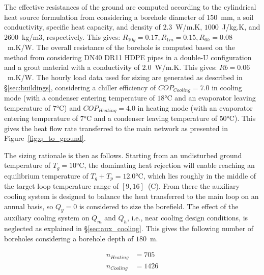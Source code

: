 The effective resistances of the ground are computed according to the cylindrical heat source formulation from \cite{Carslaw1947} considering a borehole diameter of $150$~mm, a soil conductivity, specific heat capacity, and density of $2.3$~W/m.K, $1000$~J/kg.K, and $2600$~kg/m3, respectively.
This gives: $R_{10y} = 0.17, R_{1m} = 0.15, R_{6h} = 0.08$~m.K/W.
The overall resistance of the borehole is computed based on the method from \cite{Kavanaugh2014} considering DN40 DR11 HDPE pipes in a double-U configuration and a grout material with a conductivity of $2.0$~W/m.K. This gives: $Rb = 0.06$~m.K/W.
The hourly load data used for sizing are generated as described in §\ref{sec:buildings}, considering a chiller efficiency of $COP_{Cooling} = 7.0$ in cooling mode (with a condenser entering temperature of $18$°C and an evaporator leaving temperature of $7$°C) and $COP_{Heating} = 4.0$ in heating mode (with an evaporator entering temperature of $7$°C and a condenser leaving temperature of $50$°C). This gives the heat flow rate transferred to the main network as presented in Figure~\ref{fig:q_to_ground}.

The sizing rationale is then as follows. Starting from an undisturbed ground temperature of $T_g = 10$°C, the dominating heat rejection will enable reaching an equilibrium temperature of $T_g + T_p = 12.0$°C, which lies roughly in the middle of the target loop temperature range of $[9, 16]$~(C).
From there the auxiliary cooling system is designed to balance the heat transferred to the main loop on an annual basis, so $Q_y = 0$ is considered to size the borefield. The effect of the auxiliary cooling system on $\dot{Q}_m$ and $\dot{Q}_h$, i.e., near cooling design conditions, is neglected as explained in §\ref{sec:aux_cooling}.
This gives the following number of boreholes considering a borehole depth of $180$~m.

\begin{align*}
n_{Heating} &= 705 \\
n_{Cooling} &= 1426
\end{align*}


